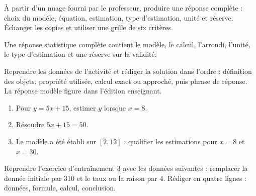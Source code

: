 \begin{activite}
À partir d'un nuage fourni par le professeur, produire une réponse complète : choix du modèle, équation, estimation, type d'estimation, unité et réserve. Échanger les copies et utiliser une grille de six critères.

\end{activite}

\begin{traceecrite}Une réponse statistique complète contient le modèle, le calcul, l'arrondi, l'unité, le type d'estimation et une réserve sur la validité.\end{traceecrite}

\begin{exemple}
Reprendre les données de l'activité et rédiger la solution dans l'ordre : définition des objets, propriété utilisée, calcul exact ou approché, puis phrase de réponse. La réponse modèle figure dans l'édition enseignant.
\end{exemple}

\begin{exercice}[-- essentiel]
\begin{enumerate}\item Pour $y=5x+15$, estimer $y$ lorsque $x=8$.\item Résoudre $5x+15=50$.\item Le modèle a été établi sur $[2,12]$ : qualifier les estimations pour $x=8$ et $x=30$.\end{enumerate}
\end{exercice}


\begin{dm}Reprendre l'exercice d'entraînement 3 avec les données suivantes : remplacer la donnée initiale par $310$ et le taux ou la raison par $4$. Rédiger en quatre lignes : données, formule, calcul, conclusion.\end{dm}


